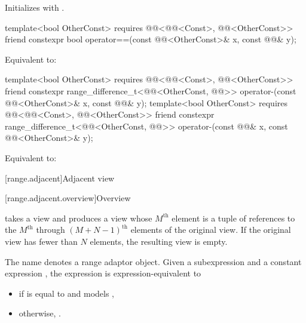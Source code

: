 \begin{itemdescr}
\pnum
\effects
Initializes  with .
\end{itemdescr}

\begin{itemdecl}
template<bool OtherConst>
  requires @@<@@<Const>, @@<OtherConst>>
friend constexpr bool operator==(const @@<OtherConst>& x, const @@& y);
\end{itemdecl}

\begin{itemdescr}
\pnum
\effects
Equivalent to: 
\end{itemdescr}

\begin{itemdecl}
template<bool OtherConst>
  requires @@<@@<Const>, @@<OtherConst>>
friend constexpr range_difference_t<@@<OtherConst, @@>>
  operator-(const @@<OtherConst>& x, const @@& y);
template<bool OtherConst>
  requires @@<@@<Const>, @@<OtherConst>>
friend constexpr range_difference_t<@@<OtherConst, @@>>
  operator-(const @@& x, const @@<OtherConst>& y);
\end{itemdecl}

\begin{itemdescr}
\pnum
\effects
Equivalent to: 
\end{itemdescr}

[range.adjacent]{Adjacent view}

[range.adjacent.overview]{Overview}

\pnum
{}%
 takes a view and
produces a view whose $M^\text{th}$ element is
a tuple of references to
the $M^\text{th}$ through $(M + N - 1)^\text{th}$ elements of
the original view.
If the original view has fewer than $N$ elements, the resulting view is empty.

\pnum
{}%
The name  denotes
a range adaptor object.
Given a subexpression  and a constant expression ,
the expression  is expression-equivalent to
\begin{itemize}
\item
{}
if  is equal to  and
 models ,
\item
otherwise, .
\end{itemize}

